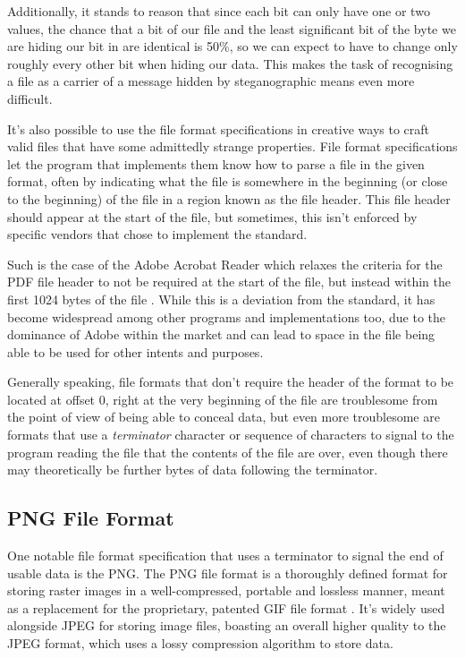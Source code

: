 Additionally, it stands to reason that since each bit can only have one or two values, the chance that a bit of our file 
and the least significant bit of the byte we are hiding our bit in are identical is 50\%, so we can expect to have to
change only roughly every other bit when hiding our data. This makes the task of recognising a file as a carrier of a
message hidden by steganographic means even more difficult.

It's also possible to use the file format specifications in creative ways to craft valid files that have some admittedly
strange properties. File format specifications let the program that implements them know how to parse 
a file in the given format, often by indicating what the file is somewhere in the beginning (or close to the beginning)
of the file in a region known as the file header. This file header should appear at the start of the file, but
sometimes, this isn't enforced by specific vendors that chose to implement the standard. 

Such is the case of the Adobe Acrobat Reader which relaxes the criteria for the \acrfull{PDF} file header to not be
required at the start of the file, but instead within the first 1024 bytes of the file \cite{adobe-acrobat-pdf}. 
While this is a deviation from the standard, it has become widespread among other programs and implementations too, 
due to the dominance of Adobe within the market and can lead to space in the file being able to be used for other 
intents and purposes.

Generally speaking, file formats that don't require the header of the format to be located at offset 0, right at the
very beginning of the file are troublesome from the point of view of being able to conceal data, but even more 
troublesome are formats that use a \emph{terminator} character or sequence of characters to signal to the program reading 
the file that the contents of the file are over, even though there may theoretically be further bytes of data following 
the terminator.

\subsection{\acrfull{PNG} File Format}

One notable file format specification that uses a terminator to signal the end of usable data is the \acrfull{PNG}.
The \acrshort{PNG} file format is a thoroughly defined format for storing raster images in a well-compressed, portable
and lossless manner, meant as a replacement for the proprietary, patented \acrfull{GIF} file format \cite{png-standard}.
It's widely used alongside \acrshort{JPEG} for storing image files, boasting an overall higher quality to the
\acrshort{JPEG} format, which uses a lossy compression algorithm to store data. %

